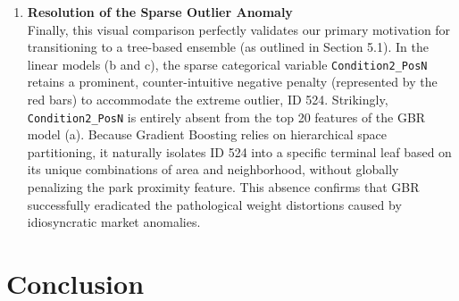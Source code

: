 \documentclass[11pt]{article}
\begin{document}
\begin{enumerate}[label=\textbf{\arabic*.}, leftmargin=*]
\vspace{0.3cm}

\item \textbf{Resolution of the Sparse Outlier Anomaly} \\
Finally, this visual comparison perfectly validates our primary motivation for transitioning to a tree-based ensemble (as outlined in Section 5.1). In the linear models (b and c), the sparse categorical variable \texttt{Condition2\_PosN} retains a prominent, counter-intuitive negative penalty (represented by the red bars) to accommodate the extreme outlier, ID 524. Strikingly, \texttt{Condition2\_PosN} is entirely absent from the top 20 features of the GBR model (a). Because Gradient Boosting relies on hierarchical space partitioning, it naturally isolates ID 524 into a specific terminal leaf based on its unique combinations of area and neighborhood, without globally penalizing the park proximity feature. This absence confirms that GBR successfully eradicated the pathological weight distortions caused by idiosyncratic market anomalies.
\end{enumerate}

\section{Conclusion}
\end{document}
